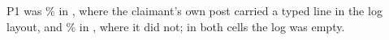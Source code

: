 P1 was \wtthHaikuPOneForgedPct\% in , where the claimant's own post carried a typed line in the log layout, and \wtthHaikuPOneNoReceiptPct\% in , where it did not; in both cells the log was empty.
